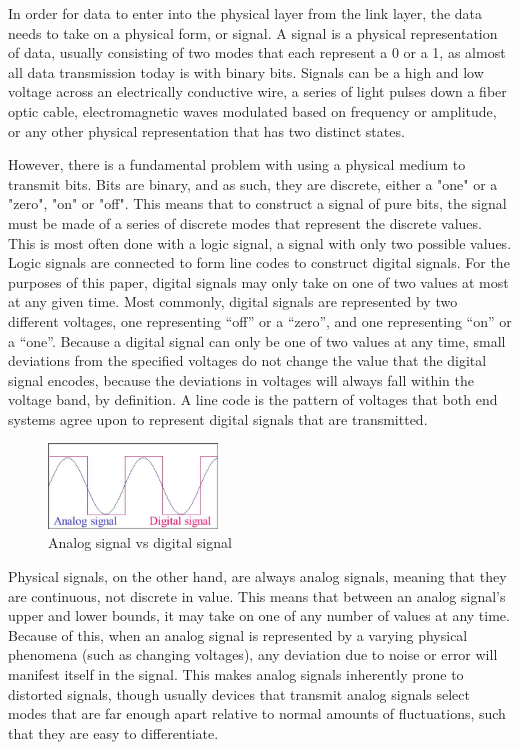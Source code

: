 \documentclass[11pt]{article}
\begin{document}
In order for data to enter into the physical layer from the link layer, the data needs to take on a physical form, or signal. A signal is a physical representation of data, usually consisting of two modes that each represent a 0 or a 1, as almost all data transmission today is with binary bits. Signals can be a high and low voltage across an electrically conductive wire, a series of light pulses down a fiber optic cable, electromagnetic waves modulated based on frequency or amplitude, or any other physical representation that has two distinct states.

However, there is a fundamental problem with using a physical medium to transmit bits. Bits are binary, and as such, they are discrete, either a "one" or a "zero", "on" or "off". This means that to construct a signal of pure bits, the signal must be made of a series of discrete modes that represent the discrete values. This is most often done with a logic signal, a signal with only two possible values. Logic signals are connected to form line codes to construct digital signals. For the purposes of this paper, digital signals may only take on one of two values at most at any given time. Most commonly, digital signals are represented by two different voltages, one representing “off” or a “zero”, and one representing “on” or a “one”. Because a digital signal can only be one of two values at any time, small deviations from the specified voltages do not change the value that the digital signal encodes, because the deviations in voltages will always fall within the voltage band, by definition. A line code is the pattern of voltages that both end systems agree upon to represent digital signals that are transmitted.

\begin{figure}[!htbp]
    \centering
    \includegraphics[width=0.4\textwidth]{analogdigitalsignalsForPaper.png}
    \caption{Analog signal vs digital signal}
    \label{fig:AnalogsignalvsDigitalsignal}
\end{figure}

Physical signals, on the other hand, are always analog signals, meaning that they are continuous, not discrete in value. This means that between an analog signal’s upper and lower bounds, it may take on one of any number of values at any time. Because of this, when an analog signal is represented by a varying physical phenomena (such as changing voltages), any deviation due to noise or error will manifest itself in the signal. This makes analog signals inherently prone to distorted signals, though usually devices that transmit analog signals select modes that are far enough apart relative to normal amounts of fluctuations, such that they are easy to differentiate. 
\end{document}
